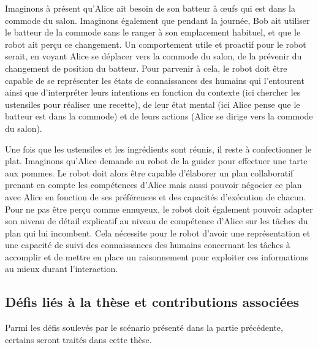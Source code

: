 \documentclass[a4paper,11pt,twoside]{StyleThese}
\begin{document}
Imaginons à présent qu'Alice ait besoin de son batteur à œufs qui est dans la commode du salon. Imaginons également que pendant la journée, Bob ait utiliser le batteur de la commode sans le ranger à son emplacement habituel, et que le robot ait perçu ce changement.
Un comportement utile et proactif pour le robot serait, en voyant Alice se déplacer vers la commode du salon, de la prévenir du changement de position du batteur.
Pour parvenir à cela, le robot doit être capable de se représenter les états de connaissances des humains qui l'entourent ainsi que d'interpréter leurs intentions en fonction du contexte (ici chercher les ustensiles pour réaliser une recette), de leur état mental (ici Alice pense que le batteur est dans la commode) et de leurs actions (Alice se dirige vers la commode du salon).

Une fois que les ustensiles et les ingrédients sont réunis, il reste à confectionner le plat. Imaginons qu'Alice demande au robot de la guider pour effectuer une tarte aux pommes. Le robot doit alors être capable d'élaborer un plan collaboratif prenant en compte les compétences d'Alice mais aussi pouvoir négocier ce plan avec Alice en fonction de ses préférences et des capacités d'exécution de chacun.
Pour ne pas être perçu comme ennuyeux, le robot doit également pouvoir adapter son niveau de détail explicatif au niveau de compétence d'Alice sur les tâches du plan qui lui incombent.
Cela nécessite pour le robot d'avoir une représentation et une capacité de suivi des connaissances des humains concernant les tâches à accomplir et de mettre en place un raisonnement pour exploiter ces informations au mieux durant l'interaction.




\subsection{Défis liés à la thèse et contributions associées}
Parmi les défis soulevés par le scénario présenté dans la partie précédente, certains seront traités dans cette thèse.
\end{document}

